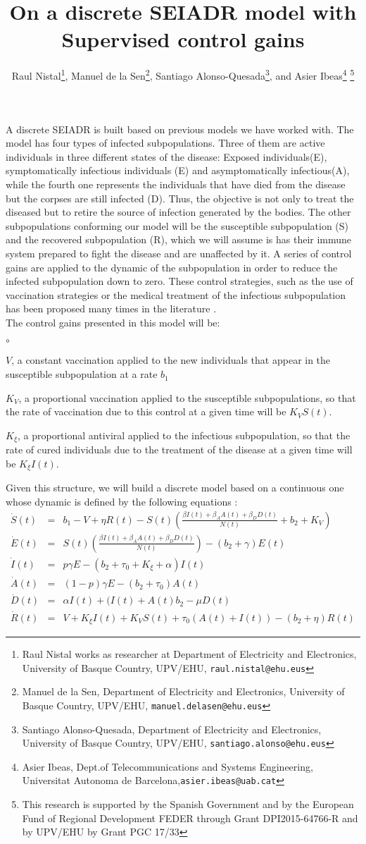 \documentclass[10pt,a4paper]{article}
\author{Raul Nistal\thanks{Raul Nistal works as researcher at Department of Electricity and Electronics,
		University of Basque Country, UPV/EHU, {\tt\small raul.nistal@ehu.eus}},
		Manuel de la Sen\thanks{Manuel de la Sen, Department of Electricity and Electronics,
		University of Basque Country, UPV/EHU, {\tt\small manuel.delasen@ehu.eus}}, 
		Santiago Alonso-Quesada\thanks{Santiago Alonso-Quesada, Department of Electricity and Electronics,
		University of Basque Country, UPV/EHU, {\tt\small santiago.alonso@ehu.eus}}, 
		and Asier Ibeas\thanks{Asier Ibeas, Dept.of Telecommunications and Systems Engineering,
	 	Universitat Autonoma de Barcelona,{\tt\small  asier.ibeas@uab.cat}}  %
		\thanks{This research is supported by the Spanish Government and by the European Fund of Regional Development FEDER through Grant DPI2015-64766-R and by UPV/EHU by Grant PGC 17/33}%
}
\title{On a discrete SEIADR model with Supervised control gains}
\begin{document}
\maketitle
A discrete SEIADR is built based on previous models we have worked with.
The model has four types of infected subpopulations.
Three of them are active individuals in three different states of the disease: Exposed individuals(E), symptomatically infectious individuals (E) and asymptomatically infectious(A), while the fourth one represents the individuals that have died from the disease but the corpses are still infected (D).
Thus, the objective is not only to treat the diseased but to retire the source of infection generated by the bodies.
The other subpopulations conforming our model will be the susceptible subpopulation (S) and the recovered subpopulation (R), which we will assume is has their immune system prepared to fight the disease and are unaffected by it.
A series of control gains are applied to the dynamic of the subpopulation in order to reduce the infected subpopulation down to zero.
These control strategies, such as the use of vaccination strategies or the medical treatment of the infectious subpopulation  has been proposed many times in the literature \cite{2,7,10,12,11,24,26,28,29}.\\
The control gains presented in this model will be:
\begin{list}{$\circ$}{}
	\item $V$, a constant vaccination applied to the new individuals that appear in the susceptible subpopulation at a rate $b_1$
	\item $K_V$, a proportional vaccination applied to the susceptible subpopulations, so that the rate of vaccination due to this control at a given time will be $K_V S(t)$.
	\item $K_\xi$, a proportional antiviral applied to the infectious subpopulation, so that the rate of cured individuals due to the treatment of the disease at a given time will be $K_\xi I(t)$.
\end{list}
Given this structure, we will build a discrete model based on a continuous one whose dynamic is defined by the following equations :
\begin{eqnarray}	
\dot{S}(t)&=&b_1 -V+\eta R(t)-S(t)\left(\frac{\beta I(t)+\beta_A A(t)+\beta_D D(t)}{N(t)}+b_2+K_V\right)\label{eqcontS}\\
\dot{E}(t)&=&S(t)\left(\frac{\beta I(t)+\beta_A A(t)+\beta_D D(t)}{N(t)}\right)-(b_2+\gamma)E(t)\\
\dot{I}(t)&=&p \gamma E -(b_2+\tau_0+K_\xi+\alpha)I(t)\\
\dot{A}(t)&=&(1-p)\gamma E-(b_2+\tau_0)A(t)\\
\dot{D}(t)&=&\alpha I(t)+(I(t)+A(t)b_2-\mu D(t)\\
\dot{R}(t)&=& V+K_\xi I(t)+K_V S(t)+\tau_0 (A(t)+I(t))-(b_2+\eta)R(t)\label{eqcontR}
\end{eqnarray}
\end{document}
